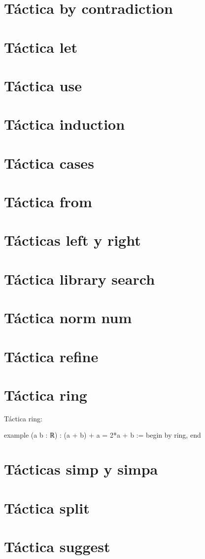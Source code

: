 \section{Táctica by contradiction}

\section{Táctica let}

\section{Táctica use}

\section{Táctica induction}

\section{Táctica cases}

\section{Táctica from}

\section{Tácticas left y right}

\section{Táctica library search}

\section{Táctica norm num}

\section{Táctica refine}

\section{Táctica ring}

Táctica ring:
\begin{leancode}
example (a b : ℝ) : (a + b) + a = 2*a + b :=
begin
  by ring,
end
\end{leancode}

\section{Tácticas simp y simpa}

\section{Táctica split}

\section{Táctica suggest}

